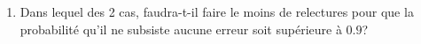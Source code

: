 \documentclass[a4paper]{tp_um}
\begin{document}
\begin{enumerate}


    \item Dans lequel des 2 cas, faudra-t-il faire le moins de relectures pour que la probabilité qu'il ne subsiste aucune erreur soit supérieure à $0.9$? 


\end{enumerate}
\end{document}

